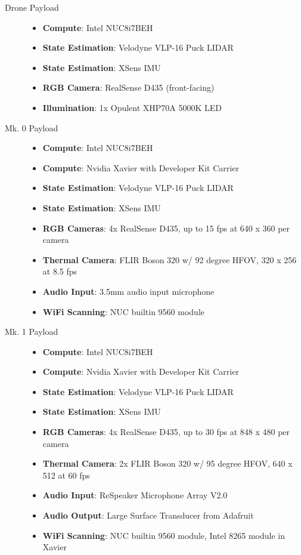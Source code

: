\begin{description}
	\item[Drone Payload] \hfill
	\begin{itemize}
		\item \textbf{Compute}: Intel NUC8i7BEH
		\item \textbf{State Estimation}: Velodyne VLP-16 Puck LIDAR
		\item \textbf{State Estimation}: XSens IMU
		\item \textbf{RGB Camera}: RealSense D435 (front-facing)
		\item \textbf{Illumination}: 1x Opulent XHP70A 5000K LED
	\end{itemize}

	\item[Mk. 0 Payload] \hfill
	\begin{itemize}
		\item \textbf{Compute}: Intel NUC8i7BEH
		\item \textbf{Compute}: Nvidia Xavier with Developer Kit Carrier
		\item \textbf{State Estimation}: Velodyne VLP-16 Puck LIDAR
		\item \textbf{State Estimation}: XSens IMU
		\item \textbf{RGB Cameras}: 4x RealSense D435, up to 15 fps at 640 x 360 per camera
		\item \textbf{Thermal Camera}: FLIR Boson 320 w/ 92 degree HFOV, 320 x 256 at 8.5 fps
		\item \textbf{Audio Input}: 3.5mm audio input microphone
		\item \textbf{WiFi Scanning}: NUC builtin 9560 module
	\end{itemize}

	\item[Mk. 1 Payload] \hfill
	\begin{itemize}
		\item \textbf{Compute}: Intel NUC8i7BEH
		\item \textbf{Compute}: Nvidia Xavier with Developer Kit Carrier
		\item \textbf{State Estimation}: Velodyne VLP-16 Puck LIDAR
		\item \textbf{State Estimation}: XSens IMU
		\item \textbf{RGB Cameras}: 4x RealSense D435, up to 30 fps at 848 x 480 per camera
		\item \textbf{Thermal Camera}: 2x FLIR Boson 320 w/ 95 degree HFOV, 640 x 512 at 60 fps
		\item \textbf{Audio Input}: ReSpeaker Microphone Array V2.0
		\item \textbf{Audio Output}: Large Surface Transducer from Adafruit
		\item \textbf{WiFi Scanning}: NUC builtin 9560 module, Intel 8265 module in Xavier
	\end{itemize}
\end{description}

